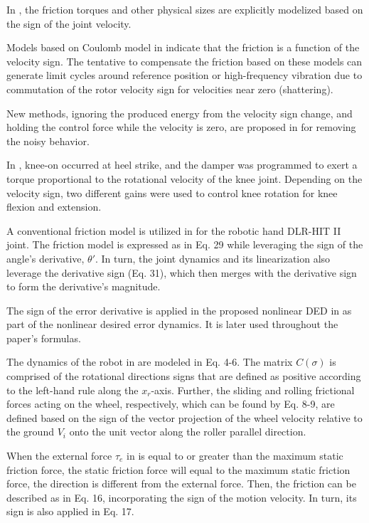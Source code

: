 \documentclass[11pt]{book}
\begin{document}
In \cite{pham2001identification}, the friction torques and other
physical sizes are explicitly modelized based on the sign of the joint
velocity.

Models based on Coulomb model in \cite{gervini2003new} indicate that
the friction is a function of the velocity sign. The tentative to
compensate the friction based on these models can generate limit cycles
around reference position or high-frequency vibration due to commutation
of the rotor velocity sign for velocities near zero (shattering).

New methods, ignoring the produced energy from the velocity sign change,
and holding the control force while the velocity is zero, are proposed
in \cite{ryu2005simulation} for removing the noisy behavior.

In \cite{walsh2006autonomous}, knee-on occurred at heel strike, and
the damper was programmed to exert a torque proportional to the rotational
velocity of the knee joint. Depending on the velocity sign, two different
gains were used to control knee rotation for knee flexion and extension.

A conventional friction model is utilized in \cite{chen2014experimental}
for the robotic hand DLR-HIT II joint. The friction model is expressed
as in Eq. 29 while leveraging the sign of the angle's derivative,
$\theta'$. In turn, the joint dynamics and its linearization also
leverage the derivative sign (Eq. 31), which then merges with the
derivative sign to form the derivative's magnitude.

The sign of the error derivative is applied in the proposed nonlinear
DED in \cite{jin2017robust} as part of the nonlinear desired error
dynamics. It is later used throughout the paper's formulas.

The dynamics of the robot in \cite{xie2018power} are modeled in Eq.
4-6. The matrix $C\left(\sigma\right)$ is comprised of the rotational
directions signs that are defined as positive according to the left-hand
rule along the $x_{r}$-axis. Further, the sliding and rolling frictional
forces acting on the wheel, respectively, which can be found by Eq.
8-9, are defined based on the sign of the vector projection of the
wheel velocity relative to the ground $V_{i}$ onto the unit vector
along the roller parallel direction.

When the external force $\tau_{e}$ in \cite{chen2018universal} is
equal to or greater than the maximum static friction force, the static
friction force will equal to the maximum static friction force, the
direction is different from the external force. Then, the friction
can be described as in Eq. 16, incorporating the sign of the motion
velocity. In turn, its sign is also applied in Eq. 17.
\end{document}
